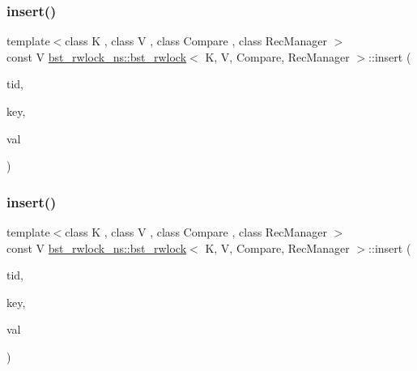 \subsubsection{\texorpdfstring{insert()}{insert()}\hspace{0.1cm}{\footnotesize\ttfamily [1/2]}}
{\footnotesize\ttfamily template$<$class K , class V , class Compare , class Rec\+Manager $>$ \\
const V \hyperlink{classbst__rwlock__ns_1_1bst__rwlock}{bst\+\_\+rwlock\+\_\+ns\+::bst\+\_\+rwlock}$<$ K, V, Compare, Rec\+Manager $>$\+::insert (\begin{DoxyParamCaption}\item[{const int}]{tid,  }\item[{const K \&}]{key,  }\item[{const V \&}]{val }\end{DoxyParamCaption})\hspace{0.3cm}{\ttfamily [inline]}}

\mbox{\label{classbst__rwlock__ns_1_1bst__rwlock_ae6c99b27e1a1d69029308fac2db945e3}} 
\subsubsection{\texorpdfstring{insert()}{insert()}\hspace{0.1cm}{\footnotesize\ttfamily [2/2]}}
{\footnotesize\ttfamily template$<$class K , class V , class Compare , class Rec\+Manager $>$ \\
const V \hyperlink{classbst__rwlock__ns_1_1bst__rwlock}{bst\+\_\+rwlock\+\_\+ns\+::bst\+\_\+rwlock}$<$ K, V, Compare, Rec\+Manager $>$\+::insert (\begin{DoxyParamCaption}\item[{const int}]{tid,  }\item[{const K \&}]{key,  }\item[{const V \&}]{val }\end{DoxyParamCaption})\hspace{0.3cm}{\ttfamily [inline]}}

\mbox{\label{classbst__rwlock__ns_1_1bst__rwlock_a1b1924a1c36bf81b71fe7c9ccb89ef9b}} 
